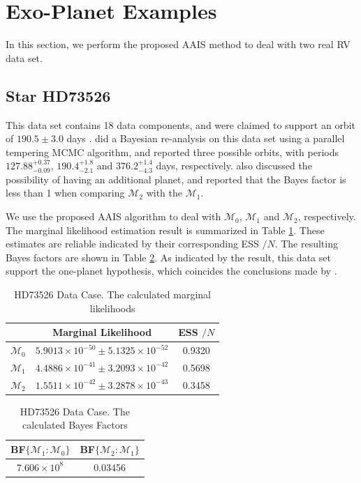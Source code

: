 \documentclass[aoas]{imsart}
\def\ESS{\textsf{ESS }}
\def\BF{\textsf{BF}}
\begin{document}
\section{Exo-Planet Examples} \label{sec:app}
In this section, we perform the proposed AAIS method to deal with
two real RV data set.

\subsection{Star HD73526}
This data set contains 18 data components, and were claimed to
support an orbit of $190.5\pm3.0$ days \citep{tinney2003four}.
\cite{gregory2005bayesian} did a Bayesian re-analysis on this data
set using a parallel tempering MCMC algorithm, and reported three
possible orbits, with periods $127.88_{-0.09}^{+0.37}$,
$190.4_{-2.1}^{+1.8}$ and $376.2_{-4.3}^{+1.4}$ days, respectively.
\cite{gregory2005bayesian} also discussed the possibility of having
an additional planet, and reported that the Bayes factor is less
than 1 when comparing $\mathcal{M}_2$ with the $\mathcal{M}_1$.

We use the proposed AAIS algorithm to deal with $\mathcal{M}_0$,
$\mathcal{M}_1$ and $\mathcal{M}_2$, respectively. The marginal
likelihood estimation result is summarized in Table
\ref{marginal_likelihood_data1}. These estimates are reliable
indicated by their corresponding \ESS$/N$. The resulting Bayes
factors are shown in Table \ref{Bayes_factor_data1}. As indicated by
the result, this data set support the one-planet hypothesis, which
coincides the conclusions made by
\cite{tinney2003four,gregory2005bayesian}.

\begin{table}
\begin{tabular}{c|c|c}
 & Marginal Likelihood & \ESS$/N$\\
\hline $\mathcal{M}_0$ & $5.9013\times10^{-50}\pm5.1325\times10^{-52}$ & 0.9320\\
\hline $\mathcal{M}_1$ & $4.4886\times10^{-41}\pm3.2093\times10^{-42}$ & 0.5698\\
\hline $\mathcal{M}_2$ & $1.5511\times10^{-42}\pm3.2878\times10^{-43}$ & 0.3458\\
\hline
\end{tabular}
\caption{HD73526 \cite{tinney2003four} Data Case. The calculated
marginal likelihoods}\label{marginal_likelihood_data1}
\end{table}

\begin{table}
\begin{tabular}{c|c}
 \BF$\{\mathcal{M}_1:\mathcal{M}_0\}$ & \BF$\{\mathcal{M}_2:\mathcal{M}_1\}$\\
\hline $7.606\times10^8$& 0.03456\\
\hline
\end{tabular}
\caption{HD73526 \citep{tinney2003four} Data Case. The calculated
Bayes Factors}\label{Bayes_factor_data1}
\end{table}
\end{document}
